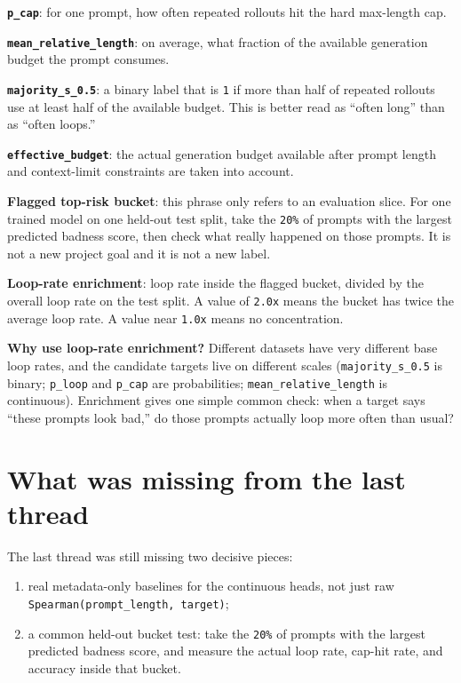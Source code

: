 \documentclass[11pt]{article}
\begin{document}
\textbf{\texttt{p\_cap}}: for one prompt, how often repeated rollouts hit the
hard max-length cap.

\textbf{\texttt{mean\_relative\_length}}: on average, what fraction of the
available generation budget the prompt consumes.

\textbf{\texttt{majority\_s\_0.5}}: a binary label that is \texttt{1} if more
than half of repeated rollouts use at least half of the available budget. This
is better read as ``often long'' than as ``often loops.''

\textbf{\texttt{effective\_budget}}: the actual generation budget available
after prompt length and context-limit constraints are taken into account.

\textbf{Flagged top-risk bucket}: this phrase only refers to an evaluation
slice. For one trained model on one held-out test split, take the \texttt{20\%}
of prompts with the largest predicted badness score, then check what really
happened on those prompts. It is not a new project goal and it is not a new
label.

\textbf{Loop-rate enrichment}: loop rate inside the flagged bucket, divided by
the overall loop rate on the test split. A value of \texttt{2.0x} means the
bucket has twice the average loop rate. A value near \texttt{1.0x} means no
concentration.

\textbf{Why use loop-rate enrichment?} Different datasets have very different
base loop rates, and the candidate targets live on different scales
(\texttt{majority\_s\_0.5} is binary; \texttt{p\_loop} and \texttt{p\_cap} are
probabilities; \texttt{mean\_relative\_length} is continuous). Enrichment gives
one simple common check: when a target says ``these prompts look bad,'' do those
prompts actually loop more often than usual?

\section*{What was missing from the last thread}
The last thread was still missing two decisive pieces:
\begin{enumerate}[leftmargin=1.5em]
\item real metadata-only baselines for the continuous heads, not just raw
\texttt{Spearman(prompt\_length, target)};
\item a common held-out bucket test: take the \texttt{20\%} of prompts with the
largest predicted badness score, and measure the actual loop rate, cap-hit
rate, and accuracy inside that bucket.
\end{enumerate}
\end{document}
